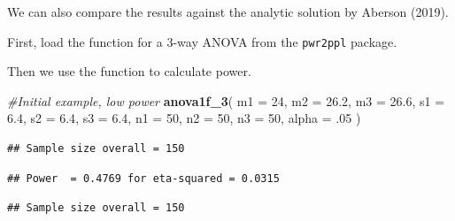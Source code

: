 \documentclass[
]{book}
\newenvironment{Shaded}{\begin{snugshade}}{\end{snugshade}}
\newcommand{\CommentTok}[1]{\textcolor[rgb]{0.56,0.35,0.01}{\textit{#1}}}
\newcommand{\DataTypeTok}[1]{\textcolor[rgb]{0.13,0.29,0.53}{#1}}
\newcommand{\DecValTok}[1]{\textcolor[rgb]{0.00,0.00,0.81}{#1}}
\newcommand{\FloatTok}[1]{\textcolor[rgb]{0.00,0.00,0.81}{#1}}
\newcommand{\KeywordTok}[1]{\textcolor[rgb]{0.13,0.29,0.53}{\textbf{#1}}}
\newcommand{\NormalTok}[1]{#1}
\begin{document}
We can also compare the results against the analytic solution by Aberson (2019).

First, load the function for a 3-way ANOVA from the \texttt{pwr2ppl} package.

Then we use the function to calculate power.

\begin{Shaded}
\begin{Highlighting}[]
\CommentTok{#Initial example, low power}
\KeywordTok{anova1f_3}\NormalTok{(}
\DataTypeTok{m1 =} \DecValTok{24}\NormalTok{,}
\DataTypeTok{m2 =} \FloatTok{26.2}\NormalTok{,}
\DataTypeTok{m3 =} \FloatTok{26.6}\NormalTok{,}
\DataTypeTok{s1 =} \FloatTok{6.4}\NormalTok{,}
\DataTypeTok{s2 =} \FloatTok{6.4}\NormalTok{,}
\DataTypeTok{s3 =} \FloatTok{6.4}\NormalTok{,}
\DataTypeTok{n1 =} \DecValTok{50}\NormalTok{,}
\DataTypeTok{n2 =} \DecValTok{50}\NormalTok{,}
\DataTypeTok{n3 =} \DecValTok{50}\NormalTok{,}
\DataTypeTok{alpha =} \FloatTok{.05}
\NormalTok{)}
\end{Highlighting}
\end{Shaded}

\begin{verbatim}
## Sample size overall = 150
\end{verbatim}

\begin{verbatim}
## Power  = 0.4769 for eta-squared = 0.0315
\end{verbatim}

\begin{Shaded}
\end{Shaded}

\begin{verbatim}
## Sample size overall = 150
\end{verbatim}
\end{document}
